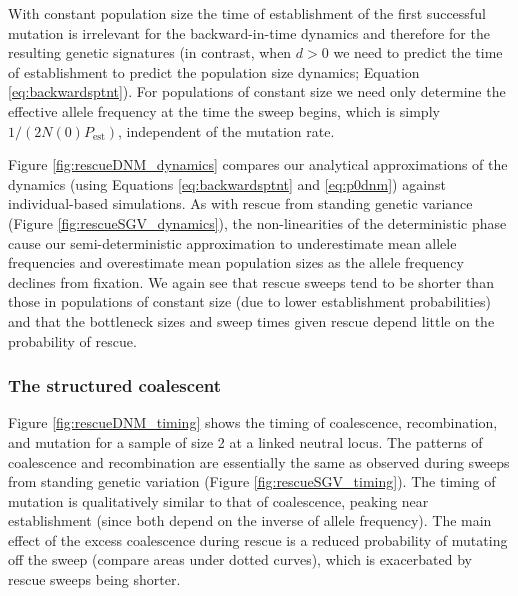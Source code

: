 \documentclass[]{article}
\begin{document}
With constant population size the time of establishment of the first successful mutation is irrelevant for the backward-in-time dynamics and therefore for the resulting genetic signatures (in contrast, when $d>0$ we need to predict the time of establishment to predict the population size dynamics; Equation \ref{eq:backwardsptnt}). 
For populations of constant size we need only determine the effective allele frequency at the time the sweep begins, which is simply $1/(2N(0)P_\mathrm{est})$, independent of the mutation rate.

Figure \ref{fig:rescueDNM_dynamics} compares our analytical approximations of the dynamics (using Equations \ref{eq:backwardsptnt} and \ref{eq:p0dnm}) against individual-based simulations.
As with rescue from standing genetic variance (Figure \ref{fig:rescueSGV_dynamics}), the non-linearities of the deterministic phase cause our semi-deterministic approximation to underestimate mean allele frequencies and overestimate mean population sizes as the allele frequency declines from fixation.
We again see that rescue sweeps tend to be shorter than those in populations of constant size (due to lower establishment probabilities) and that the bottleneck sizes and sweep times given rescue depend little on the probability of rescue.

\subsubsection*{The structured coalescent}

Figure \ref{fig:rescueDNM_timing} shows the timing of coalescence, recombination, and mutation for a sample of size 2 at a linked neutral locus. 
The patterns of coalescence and recombination are essentially the same as observed during sweeps from standing genetic variation (Figure \ref{fig:rescueSGV_timing}).
The timing of mutation is qualitatively similar to that of coalescence, peaking near establishment (since both depend on the inverse of allele frequency).
The main effect of the excess coalescence during rescue is a reduced probability of mutating off the sweep (compare areas under dotted curves), which is exacerbated by rescue sweeps being shorter.
\end{document}
